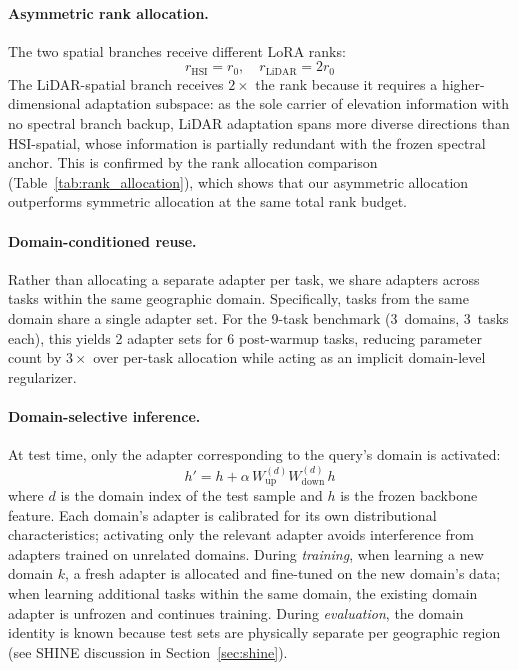 \paragraph{Asymmetric rank allocation.}
The two spatial branches receive different LoRA ranks:
\begin{equation}
    r_{\mathrm{HSI}} = r_0, \quad r_{\mathrm{LiDAR}} = 2 r_0
\label{eq:rank}
\end{equation}
The LiDAR-spatial branch receives $2\times$ the rank because it requires a higher-dimensional adaptation subspace: as the sole carrier of elevation information with no spectral branch backup, LiDAR adaptation spans more diverse directions than HSI-spatial, whose information is partially redundant with the frozen spectral anchor.
This is confirmed by the rank allocation comparison (Table~\ref{tab:rank_allocation}), which shows that our asymmetric allocation outperforms symmetric allocation at the same total rank budget.

\paragraph{Domain-conditioned reuse.}
Rather than allocating a separate adapter per task, we share adapters across tasks within the same geographic domain.
Specifically, tasks from the same domain share a single adapter set.
For the 9-task benchmark (3~domains, 3~tasks each), this yields 2 adapter sets for 6 post-warmup tasks, reducing parameter count by $3\times$ over per-task allocation while acting as an implicit domain-level regularizer.

\paragraph{Domain-selective inference.}
At test time, only the adapter corresponding to the query's domain is activated:
\begin{equation}
    h' = h + \alpha\, W_{\mathrm{up}}^{(d)} W_{\mathrm{down}}^{(d)}\, h
\label{eq:domain_selective}
\end{equation}
where $d$ is the domain index of the test sample and $h$ is the frozen backbone feature.
Each domain's adapter is calibrated for its own distributional characteristics; activating only the relevant adapter avoids interference from adapters trained on unrelated domains.
During \emph{training}, when learning a new domain $k$, a fresh adapter is allocated and fine-tuned on the new domain's data; when learning additional tasks within the same domain, the existing domain adapter is unfrozen and continues training.
During \emph{evaluation}, the domain identity is known because test sets are physically separate per geographic region (see SHINE discussion in Section~\ref{sec:shine}).

